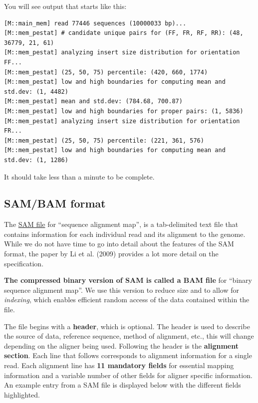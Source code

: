 \documentclass[
  letterpaper,
  DIV=11,
  numbers=noendperiod]{scrreprt}
\begin{document}
You will see output that starts like this:

\begin{verbatim}
[M::main_mem] read 77446 sequences (10000033 bp)...
[M::mem_pestat] # candidate unique pairs for (FF, FR, RF, RR): (48, 36779, 21, 61)
[M::mem_pestat] analyzing insert size distribution for orientation FF...
[M::mem_pestat] (25, 50, 75) percentile: (420, 660, 1774)
[M::mem_pestat] low and high boundaries for computing mean and std.dev: (1, 4482)
[M::mem_pestat] mean and std.dev: (784.68, 700.87)
[M::mem_pestat] low and high boundaries for proper pairs: (1, 5836)
[M::mem_pestat] analyzing insert size distribution for orientation FR...
[M::mem_pestat] (25, 50, 75) percentile: (221, 361, 576)
[M::mem_pestat] low and high boundaries for computing mean and std.dev: (1, 1286)
\end{verbatim}

It should take less than a minute to be complete.

\hypertarget{sambam-format}{%
\subsection{SAM/BAM format}\label{sambam-format}}

The \href{https://genome.sph.umich.edu/wiki/SAM}{SAM file} for
``sequence alignment map'', is a tab-delimited text file that contains
information for each individual read and its alignment to the genome.
While we do not have time to go into detail about the features of the
SAM format, the paper by Li et al. (2009) provides a lot more detail on
the specification.

\textbf{The compressed binary version of SAM is called a BAM file} for
``binary sequence alignment map''. We use this version to reduce size
and to allow for \emph{indexing}, which enables efficient random access
of the data contained within the file.

The file begins with a \textbf{header}, which is optional. The header is
used to describe the source of data, reference sequence, method of
alignment, etc., this will change depending on the aligner being used.
Following the header is the \textbf{alignment section}. Each line that
follows corresponds to alignment information for a single read. Each
alignment line has \textbf{11 mandatory fields} for essential mapping
information and a variable number of other fields for aligner specific
information. An example entry from a SAM file is displayed below with
the different fields highlighted.
\end{document}
